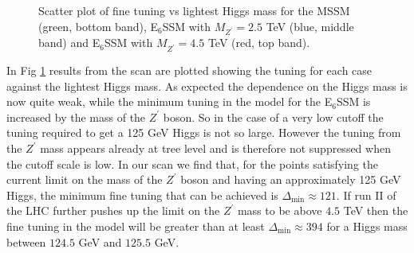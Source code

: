\documentclass[preprint,amsmath,amssymb,aps,superscriptaddress,prd,showpacs,floatfix,nofootinbib]{revtex4-1}
\begin{document}
\begin{figure}[h]
\begin{center}
\caption{Scatter plot of fine tuning vs lightest Higgs mass for the
  MSSM (green, bottom band), E$_6$SSM with $M_{Z^\prime} = 2.5$ TeV (blue, middle band) and
  E$_6$SSM with $M_{Z^\prime} = 4.5$ TeV (red, top band).}
\label{Fig:e6ssmvsmssm}
\end{center}
\end{figure}
In Fig \ref{Fig:e6ssmvsmssm} results from the scan are plotted showing
the tuning for each case against the lightest Higgs mass.  As expected
the dependence on the Higgs mass is now quite weak, while the minimum
tuning in the model for the E$_6$SSM is increased by the mass of the
$Z^\prime$ boson.  So in the case of a very low cutoff the tuning
required to get a 125 GeV Higgs is not so large.  However the tuning
from the $Z^\prime$ mass appears already at tree level and is
therefore not suppressed when the cutoff scale is low. In our scan we
find that, for the points satisfying the current limit on the mass of
the $Z^\prime$ boson and having an approximately 125 GeV Higgs, the
minimum fine tuning that can be achieved is
$\Delta_{\textrm{min}}\approx 121$. If run II of the LHC further
pushes up the limit on the $Z^\prime$ mass to be above $4.5$ TeV then
the fine tuning in the model will be greater than at least
$\Delta_{\textrm{min}}\approx 394$ for a Higgs mass between $124.5$
GeV and $125.5$ GeV.
\end{document}
